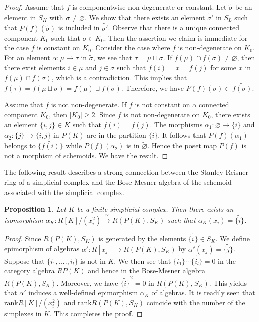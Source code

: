 \documentclass{amsart}
\newtheorem{prop}[thm]{Proposition}
\theoremstyle{definition}
\theoremstyle{remark}
\newcommand{\K}{R}%
\begin{document}
\begin{proof}
Assume that $f$ is componentwise non-degenerate or constant. Let $\widetilde{\sigma}$ be an element in $S_K$ 
with $\sigma \neq \varnothing$. We show that  
there exists an element $\widetilde{\sigma'}$ in $S_L$ such that $P(f)(\widetilde{\sigma})$ is included in $\widetilde{\sigma'}$. 
Observe that there is a unique connected component $K_0$ such that $\sigma \in K_0$. Then the assertion we claim is immediate for the case $f$ is constant on $K_0$. 
Consider the case where $f$ is non-degenerate on $K_0$. 
For an element $\alpha : \mu \to \tau$ in $\widetilde{\sigma}$, we see that $\tau = \mu \sqcup \sigma$.
If $f(\mu) \cap f(\sigma) \neq \varnothing$, then there exist elements $i \in \mu$ and $j \in \sigma$ such that $f(i)=x=f(j)$ 
for some $x$ in $f(\mu) \cap f(\sigma)$, which is a contradiction. 
This implies that $f(\tau)=f(\mu \sqcup \sigma)=f(\mu) \sqcup f(\sigma)$.
Therefore,  we have $P(f)(\sigma) \subset \widetilde{f(\sigma)}$.

Assume that $f$ is not non-degenerate. If $f$ is not constant on a connected component $K_0$, then $|K_0| \ge 2$.
Since $f$ is not non-degenerate on $K_0$, there exists an element $\{ i, j \} \in K$ such that $f(i) = f(j)$.
The morphisms $\alpha_1 : \varnothing \to \{ i \}$ and $\alpha_2 : \{ j \} \to \{ i, j \}$ in $P(K)$ are in the partition $\widetilde{\{ i \}}$.
It follows that $P(f)(\alpha_1)$ belongs to $\widetilde{\{ f(i) \}}$ while $P(f)(\alpha_2)$ is in $\widetilde{\varnothing}$.
Hence the poset map $P(f)$ is not a morphism of schemoids. We have the result.
\end{proof}

The following result describes a strong connection between the Stanley-Reisner ring of a simplicial complex and the Bose-Mesner algebra of the schemoid associated with the simplicial complex.  

\begin{prop}\label{prop:B-MvsS-R} Let $K$ be a finite simplicial complex. Then there exists an isomorphism 
$\alpha_K : \K[K]/(x_i^2) \stackrel{\cong}{\to} \K(P(K), S_K)$ such that $\alpha_K(x_i) =\widetilde{\{i\}}$. 
\end{prop}

\begin{proof}
Since $\K(P(K), S_K)$ is generated by the elements $\widetilde{\{i\}} \in S_K$. We define epimorphism 
of algebras $\alpha' : \K[x_j] \to \K(P(K), S_K)$ by $\alpha'(x_j) = \widetilde{\{j\}}$. Suppose that $\{{i_1}, ...., {i_l}\}$ is not in 
$K$. We then see that $\widetilde{\{{i_1}\}}\cdots \widetilde{\{{i_l}\}} = 0$ in the category algebra $\K P(K)$ and hence in 
the Bose-Mesner algebra $\K(P(K), S_K)$. Moreover, we have $\widetilde{\{i\}}^2= 0$ in $\K(P(K), S_K)$. This yields that 
$\alpha'$ induces a well-defined epimorphism $\alpha_K$ of algebras. It is readily seen that $\text{rank} \K[K]/(x_i^2)$ and 
$\text{rank} \K(P(K), S_K)$ coincide with the number of the simplexes in $K$. This completes the proof. 
\end{proof}
\end{document}

